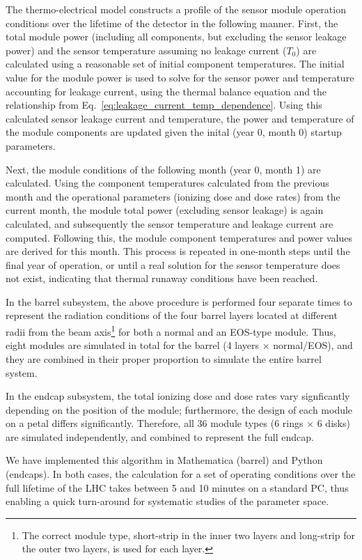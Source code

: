 \label{sec:running}
The thermo-electrical model constructs a profile of the sensor module operation conditions over the
lifetime of the detector in the following manner. First, the total module power (including all components, but excluding the sensor
leakage power) and the sensor temperature assuming no leakage current ($T_0$) are calculated 
using a reasonable set of initial component temperatures.
The initial value for the module power is used to solve for the sensor power and temperature accounting
for leakage current, using the thermal balance equation and the relationship from
Eq.~\ref{eq:leakage_current_temp_dependence}.
Using this calculated sensor leakage current and temperature, the power and temperature of the module
components are updated given the inital (year 0, month 0) startup parameters.

Next, the module conditions of the following month (year 0, month 1) are calculated. Using the component
temperatures calculated from the previous month and the operational parameters (ionizing dose and dose
rates) from the current month, the module total power (excluding sensor leakage) is again calculated, and
subsequently the sensor temperature and leakage current are computed. Following this,
the module component temperatures and power values are derived for this month. This process is repeated in one-month
steps until the final year of operation, or until a real solution for the sensor temperature does not
exist, indicating that thermal runaway conditions have been reached.

In the barrel subsystem, the above procedure is performed four separate times to
represent the radiation conditions of the four barrel layers located at different radii from the beam axis\footnote{The correct module type, short-strip in the inner two layers and long-strip for the outer two layers, is used for each layer.} for both a normal and an EOS-type module. Thus, eight modules are simulated in total for the barrel (4 layers $\times$ normal/EOS), and they are combined in their proper proportion to simulate the entire barrel system.

In the endcap subsystem, the total ionizing dose and dose rates vary signficantly depending on the
position of the module; furthermore, the design of each module on a petal differs significantly.
Therefore, all 36 module types (6 rings $\times$ 6 disks) are simulated independently, and combined to
represent the full endcap.

We have implemented this algorithm in Mathematica (barrel) and Python (endcaps). In both cases, the calculation for a set of operating conditions over the full lifetime of the LHC takes between 5 and 10 minutes on a standard PC, thus enabling a quick turn-around for systematic studies of the parameter space.

